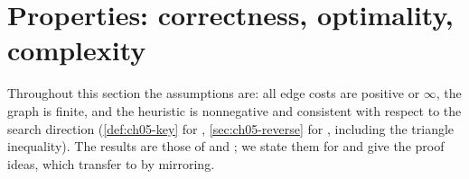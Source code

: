 \FloatBarrier
\section{Properties: correctness, optimality, complexity}
\label{sec:ch05-properties}

Throughout this section the assumptions are: all edge costs are positive or $\infty$,
the graph is finite, and the heuristic is nonnegative and consistent with respect to
the search direction (\cref{def:ch05-key} for \lpastar, \cref{sec:ch05-reverse} for
\dstarlite, including the triangle inequality). The results are those of
\textcite{koenig2004lpa} and \textcite{koenig2002dstarlite}; we state them for
\dstarlite and give the proof ideas, which transfer to \lpastar by mirroring.

